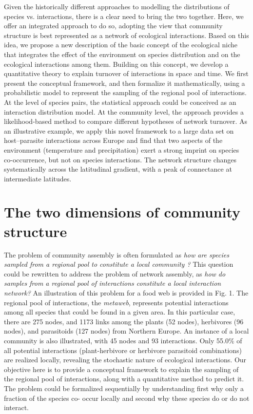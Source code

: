 \documentclass[12pt]{article}
\begin{document}
Given the historically different approaches to modelling the distributions of
species vs. interactions, there is a clear need to bring the two together.
Here, we offer an integrated approach to do so, adopting the view that
community structure is best represented as a network of ecological
interactions. Based on this idea, we propose a new description of the basic
concept of the ecological niche that integrates the effect of the environment
on species distribution and on the ecological interactions among them.
Building on this concept, we develop a quantitative theory to explain turnover
of interactions in space and time. We first present the conceptual framework,
and then formalize it mathematically, using a probabilistic model to represent
the sampling of the regional pool of interactions. At the level of species
pairs, the statistical approach could be conceived as an interaction
distribution model. At the community level, the approach provides a
likelihood-based method to compare different hypotheses of network turnover.
As an illustrative example, we apply this novel framework to a large data set
on host–parasite interactions across Europe and find that two aspects of the
environment (temperature and precipitation) exert a strong imprint on species
co-occurrence, but not on species interactions. The network structure changes
systematically across the latitudinal gradient, with a peak of connectance at
intermediate latitudes.

\section*{The two dimensions of community structure}

The problem of community assembly is often formulated as \textit{how are
species sampled from a regional pool to constitute a local community
\citep{Gotzenberger2012}?} This question could be rewritten to address the
problem of network assembly, as \textit{how do samples from a regional pool of
interactions constitute a local interaction network?} An illustration of this
problem for a food web is provided in Fig. 1. The regional pool of
interactions, the \emph{metaweb}, represents potential interactions among all
species that could be found in a given area. In this particular case, there
are 275 nodes, and 1173 links among the plants (52 nodes), herbivores (96
nodes), and parasitoids (127 nodes) from Northern Europe. An instance of a
local community is also illustrated, with 45 nodes and 93 interactions. Only
55.0\% of all potential interactions (plant-herbivore or herbivore parasitoid
combinations) are realized locally, revealing the stochastic nature of
ecological interactions. Our objective here is to provide a conceptual
framework to explain the sampling of the regional pool of interactions, along
with a quantitative method to predict it. The problem could be formalized
sequentially by understanding first why only a fraction of the species co-
occur locally and second why these species do or do not interact.
\end{document}
